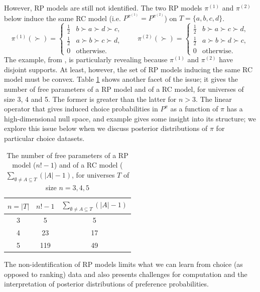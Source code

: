 \documentclass[11pt,letter]{article}
\begin{document}
However, RP models are still not identified.
The two RP models $\pi^{(1)}$ and $\pi^{(2)}$ below induce the same RC model (i.e. $P^{\pi^{(1)}} = P^{\pi^{(2)}}$) on $T = \{a,b,c,d\}$.
\[
  \pi^{(1)}(\succ) =
  \begin{cases}
    \tfrac{1}{2} & b \succ a \succ d \succ c, \\
    \tfrac{1}{2} & a \succ b \succ c \succ d, \\
    0 & \mbox{otherwise}.
  \end{cases}
  \qquad
  \pi^{(2)}(\succ) =
  \begin{cases}
    \tfrac{1}{2} & b \succ a \succ c \succ d, \\
    \tfrac{1}{2} & a \succ b \succ d \succ c, \\
    0 & \mbox{otherwise}.
  \end{cases}
\]
The example, from , is particularly revealing because $\pi^{(1)}$ and $\pi^{(2)}$ have disjoint supports.
At least, however, the set of RP models inducing the same RC model must be convex.
Table \ref{t:free} shows another facet of the issue; it gives the number of free parameters of a RP model and of a RC model, for universes of size 3, 4 and 5.
The former is greater than the latter for $n>3$.
The linear operator that gives induced choice probabilities in $P^\pi$ as a function of $\pi$ has a high-dimensional null space, and  example gives some insight into its structure; we explore this issue below when we discuss posterior distributions of $\pi$ for particular choice datasets.
\begin{table}\begin{center}
  \begin{tabular}{ccc}
    $n=|T|$ & $n!-1$ & $\sum_{\emptyset \neq A \subseteq T} (|A|-1)$ \\
    \hline
    3 & 5 & 5 \\
    4 & 23 & 17 \\
    5 & 119 & 49 \\
    \hline
  \end{tabular}\caption{The number of free parameters of a RP model ($n!-1$) and of a RC model ($\sum_{\emptyset \neq A \subseteq T} (|A|-1)$, for universes $T$ of size $n=3,4,5$}\label{t:free}
\end{center}\end{table}
The non-identification of RP models limits what we can learn from choice (as opposed to ranking) data and also presents challenges for computation and the interpretation of posterior distributions of preference probabilities.
\end{document}
